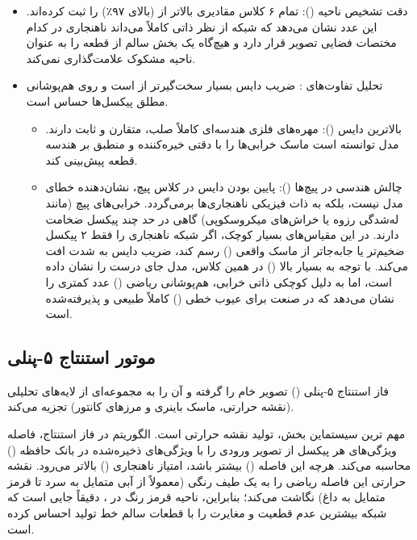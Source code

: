 \documentclass{article}
\begin{document}
\begin{itemize}
	\item دقت تشخیص ناحیه (): تمام ۶ کلاس مقادیری بالاتر از  (بالای ۹۷٪) را ثبت کرده‌اند. این عدد نشان می‌دهد که شبکه از نظر ذاتی کاملاً می‌داند ناهنجاری در کدام مختصات فضایی تصویر قرار دارد و هیچ‌گاه یک بخش سالم از قطعه را به عنوان ناحیه مشکوک علامت‌گذاری نمی‌کند.
	
	\item تحلیل تفاوت‌های : ضریب دایس بسیار سخت‌گیرتر از  است و روی هم‌پوشانی مطلق پیکسل‌ها حساس است.
	\begin{itemize}
		\item بالاترین دایس (): مهره‌های فلزی هندسه‌ای کاملاً صلب، متقارن و ثابت دارند. مدل توانسته است ماسک خرابی‌ها را با دقتی خیره‌کننده و منطبق بر هندسه قطعه پیش‌بینی کند.
		\item چالش هندسی در پیچ‌ها (): پایین بودن دایس در کلاس پیچ، نشان‌دهنده خطای مدل نیست، بلکه به ذات فیزیکی ناهنجاری‌ها برمی‌گردد. خرابی‌های پیچ (مانند له‌شدگی رزوه یا خراش‌های میکروسکوپی) گاهی در حد چند پیکسل ضخامت دارند. در این مقیاس‌های بسیار کوچک، اگر شبکه ناهنجاری را فقط ۲ پیکسل ضخیم‌تر یا جابه‌جاتر از ماسک واقعی () رسم کند، ضریب دایس به شدت افت می‌کند. با توجه به  بسیار بالا () در همین کلاس، مدل جای درست را نشان داده است، اما به دلیل کوچکی ذاتی خرابی، هم‌پوشانی ریاضی () عدد کمتری را نشان می‌دهد که در صنعت برای عیوب خطی () کاملاً طبیعی و پذیرفته‌شده است.
	\end{itemize}
\end{itemize}


\subsection{موتور استنتاج ۵-پنلی }
\label{subsec:5Panel}

فاز استنتاج ۵-پنلی () تصویر خام را گرفته و آن را به مجموعه‌ای از لایه‌های تحلیلی (نقشه حرارتی، ماسک باینری و مرزهای کانتور) تجزیه می‌کند.

مهم ترین سیستماین بخش، تولید نقشه حرارتی است. الگوریتم  در فاز استنتاج، فاصله ویژگی‌های هر پیکسل از تصویر ورودی را با ویژگی‌های ذخیره‌شده در بانک حافظه () محاسبه می‌کند. هرچه این فاصله () بیشتر باشد، امتیاز ناهنجاری () بالاتر می‌رود. نقشه حرارتی این فاصله ریاضی را به یک طیف رنگی (معمولاً از آبی متمایل به سرد تا قرمز متمایل به داغ) نگاشت می‌کند؛ بنابراین، ناحیه قرمز رنگ در ، دقیقاً جایی است که شبکه بیشترین عدم قطعیت و مغایرت را با قطعات سالم خط تولید احساس کرده است.
\end{document}

